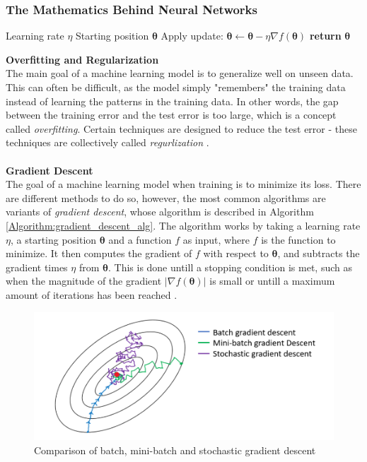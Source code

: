 \documentclass[./main.tex]{subfiles}
\begin{document}
\subsubsection{The Mathematics Behind Neural Networks}
\begin{algorithm}[h]
    \caption{$\mathbf{GradientDescent}$ \cite{d2l}}
    \label{Algorithm:gradient_descent_alg}
    \begin{algorithmic}[1]
        \Require Learning rate $\eta$
        \Require Starting position $\bm{\theta}$
            \State Apply update: $\bm{\theta} \gets  \bm{\theta} - \eta \nabla f(\bm{\theta})$
        \EndWhile
        \State \textbf{return} $\bm{\theta}$
    \end{algorithmic}
\end{algorithm}
\noindent \textbf{Overfitting and Regularization} \\
The main goal of a machine learning model is to generalize well on unseen data. This can often be difficult, as the model simply "remembers" the training data instead of learning the patterns in the training data. In other words, the gap between the training error and the test error is too large, which is a concept called \textit{overfitting}. Certain techniques are designed to reduce the test error - these techniques are collectively called \textit{regurlization} \cite{DeepLearning}. 
\\
\\
\textbf{Gradient Descent} \\
The goal of a machine learning model when training is to minimize its loss. There are different methods to do so, however, the most common algorithms are variants of \textit{gradient descent}, whose algorithm is described in Algorithm \ref{Algorithm:gradient_descent_alg}. The algorithm works by taking a learning rate $\eta$, a starting position $\bm{\theta}$ and a function $f$ as input, where $f$ is the function to minimize. It then computes the gradient of $f$ with respect to $\bm{\theta}$, and subtracts the gradient times $\eta$ from $\bm{\theta}$. This is done untill a stopping condition is met, such as when the magnitude of the gradient $\left| \nabla f(\bm{\theta}) \right|$ is small or untill a maximum amount of iterations has been reached \cite{d2l}.
\begin{figure}
    \centering
    \includegraphics[width = 8 cm]{entities/batch_methods.PNG}
    \caption{Comparison of batch, mini-batch and stochastic gradient descent \cite{EML_optimization}}
    \label{fig:batch_methods}
\end{figure}
\end{document}
